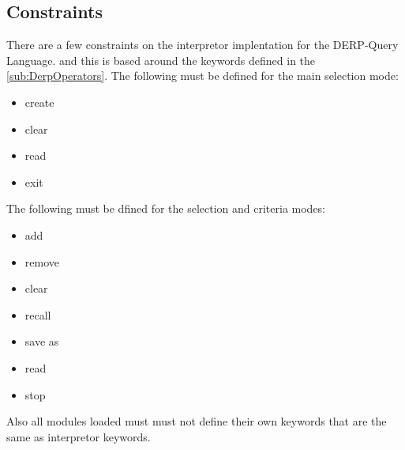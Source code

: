 \subsection{Constraints}
There are a few constraints on the interpretor implentation for the DERP-Query Language. and this is based around the keywords  defined in the \autoref{sub:DerpOperators}. The following must be defined for the main selection mode:\\

\begin{itemize}
\item create 
\item clear
\item read
\item exit 
\end{itemize}

The following must be dfined for the selection and criteria modes:

\begin{itemize}
\item add
\item remove
\item clear
\item recall
\item save as
\item read
\item stop
\end{itemize}

Also all modules loaded must must not define their own keywords that are the same as interpretor keywords.
